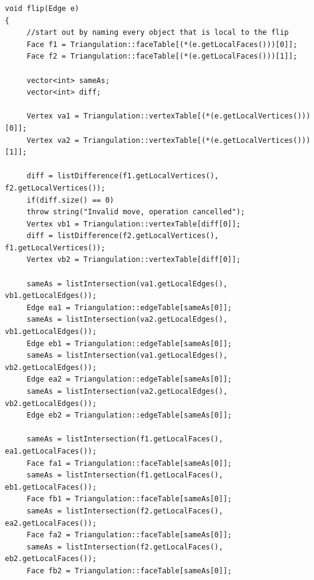 \documentclass[12pt]{article}
\begin{document}
\begin{verbatim}
void flip(Edge e)
{
     //start out by naming every object that is local to the flip
     Face f1 = Triangulation::faceTable[(*(e.getLocalFaces()))[0]];
     Face f2 = Triangulation::faceTable[(*(e.getLocalFaces()))[1]];
     
     vector<int> sameAs;
     vector<int> diff;
     
     Vertex va1 = Triangulation::vertexTable[(*(e.getLocalVertices()))[0]];
     Vertex va2 = Triangulation::vertexTable[(*(e.getLocalVertices()))[1]];
          
     diff = listDifference(f1.getLocalVertices(), f2.getLocalVertices());
     if(diff.size() == 0)
     throw string("Invalid move, operation cancelled");
     Vertex vb1 = Triangulation::vertexTable[diff[0]];
     diff = listDifference(f2.getLocalVertices(), f1.getLocalVertices());
     Vertex vb2 = Triangulation::vertexTable[diff[0]];
     
     sameAs = listIntersection(va1.getLocalEdges(), vb1.getLocalEdges());
     Edge ea1 = Triangulation::edgeTable[sameAs[0]];
     sameAs = listIntersection(va2.getLocalEdges(), vb1.getLocalEdges());
     Edge eb1 = Triangulation::edgeTable[sameAs[0]];
     sameAs = listIntersection(va1.getLocalEdges(), vb2.getLocalEdges());
     Edge ea2 = Triangulation::edgeTable[sameAs[0]];
     sameAs = listIntersection(va2.getLocalEdges(), vb2.getLocalEdges());
     Edge eb2 = Triangulation::edgeTable[sameAs[0]];
     
     sameAs = listIntersection(f1.getLocalFaces(), ea1.getLocalFaces());
     Face fa1 = Triangulation::faceTable[sameAs[0]];
     sameAs = listIntersection(f1.getLocalFaces(), eb1.getLocalFaces());
     Face fb1 = Triangulation::faceTable[sameAs[0]];
     sameAs = listIntersection(f2.getLocalFaces(), ea2.getLocalFaces());
     Face fa2 = Triangulation::faceTable[sameAs[0]];
     sameAs = listIntersection(f2.getLocalFaces(), eb2.getLocalFaces());
     Face fb2 = Triangulation::faceTable[sameAs[0]];
     

\end{verbatim}
\end{document}
